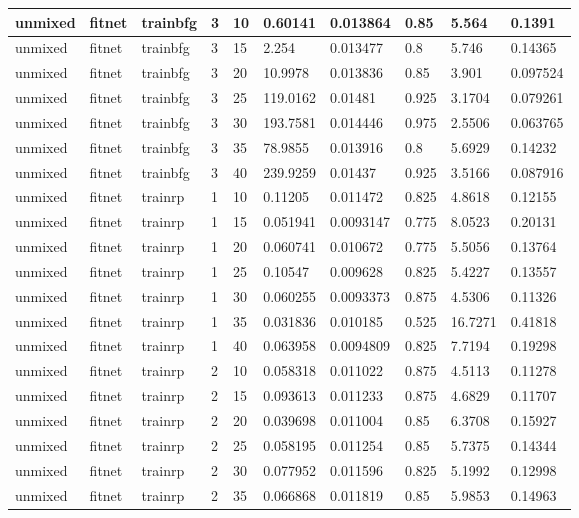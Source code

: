 \begin{longtable}{lllllllll}
unmixed & fitnet & trainbfg & 3 & 10 & 0.60141 & 0.013864 & 0.85 & 5.564 & 0.1391 \\ \hline 
unmixed & fitnet & trainbfg & 3 & 15 & 2.254 & 0.013477 & 0.8 & 5.746 & 0.14365 \\ \hline 
unmixed & fitnet & trainbfg & 3 & 20 & 10.9978 & 0.013836 & 0.85 & 3.901 & 0.097524 \\ \hline 
unmixed & fitnet & trainbfg & 3 & 25 & 119.0162 & 0.01481 & 0.925 & 3.1704 & 0.079261 \\ \hline 
unmixed & fitnet & trainbfg & 3 & 30 & 193.7581 & 0.014446 & 0.975 & 2.5506 & 0.063765 \\ \hline 
unmixed & fitnet & trainbfg & 3 & 35 & 78.9855 & 0.013916 & 0.8 & 5.6929 & 0.14232 \\ \hline 
unmixed & fitnet & trainbfg & 3 & 40 & 239.9259 & 0.01437 & 0.925 & 3.5166 & 0.087916 \\ \hline 
unmixed & fitnet & trainrp & 1 & 10 & 0.11205 & 0.011472 & 0.825 & 4.8618 & 0.12155 \\ \hline 
unmixed & fitnet & trainrp & 1 & 15 & 0.051941 & 0.0093147 & 0.775 & 8.0523 & 0.20131 \\ \hline 
unmixed & fitnet & trainrp & 1 & 20 & 0.060741 & 0.010672 & 0.775 & 5.5056 & 0.13764 \\ \hline 
unmixed & fitnet & trainrp & 1 & 25 & 0.10547 & 0.009628 & 0.825 & 5.4227 & 0.13557 \\ \hline 
unmixed & fitnet & trainrp & 1 & 30 & 0.060255 & 0.0093373 & 0.875 & 4.5306 & 0.11326 \\ \hline 
unmixed & fitnet & trainrp & 1 & 35 & 0.031836 & 0.010185 & 0.525 & 16.7271 & 0.41818 \\ \hline 
unmixed & fitnet & trainrp & 1 & 40 & 0.063958 & 0.0094809 & 0.825 & 7.7194 & 0.19298 \\ \hline 
unmixed & fitnet & trainrp & 2 & 10 & 0.058318 & 0.011022 & 0.875 & 4.5113 & 0.11278 \\ \hline 
unmixed & fitnet & trainrp & 2 & 15 & 0.093613 & 0.011233 & 0.875 & 4.6829 & 0.11707 \\ \hline 
unmixed & fitnet & trainrp & 2 & 20 & 0.039698 & 0.011004 & 0.85 & 6.3708 & 0.15927 \\ \hline 
unmixed & fitnet & trainrp & 2 & 25 & 0.058195 & 0.011254 & 0.85 & 5.7375 & 0.14344 \\ \hline 
unmixed & fitnet & trainrp & 2 & 30 & 0.077952 & 0.011596 & 0.825 & 5.1992 & 0.12998 \\ \hline 
unmixed & fitnet & trainrp & 2 & 35 & 0.066868 & 0.011819 & 0.85 & 5.9853 & 0.14963 \\ \hline 

\end{longtable}
